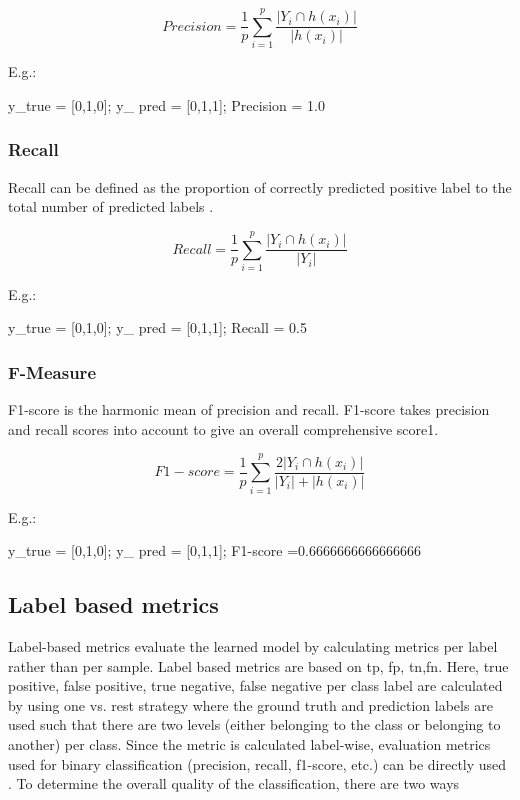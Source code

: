 $$Precision = \frac{1}{p}\sum_{i =1}^{p}\frac{|Y_i \cap h(x_i)|}{|h(x_i)|}$$ \cite{zhang2010multi}

E.g.: 

y\_true = [0,1,0]; 
y\_ pred = [0,1,1];  
Precision = 1.0

\subsubsection{Recall}

Recall can be defined as the proportion of correctly predicted positive label to the total number of predicted labels \cite{sorower2010literature}.

$$Recall = \frac{1}{p}\sum_{i =1}^{p}\frac{|Y_i \cap h(x_i)|}{|Y_i|}$$ \cite{zhang2010multi}

E.g.: 

y\_true = [0,1,0]; 
y\_ pred = [0,1,1];  
Recall = 0.5

\subsubsection{F-Measure}
F1-score is the harmonic mean of precision and recall. F1-score takes precision and recall scores into account to give an overall comprehensive score1\cite{sorower2010literature}.

$$F1-score = \frac{1}{p}\sum_{i =1}^{p}\frac{2|Y_i \cap h(x_i)|}{|Y_i| + |h(x_i)|}$$ \cite{zhang2010multi}

E.g.: 

y\_true = [0,1,0]; 
y\_ pred = [0,1,1]; 
F1-score =0.6666666666666666

\subsection{Label based metrics}
Label-based metrics evaluate the learned model by calculating metrics per label rather than per sample\cite{zhang2013review}. Label based metrics are based on \acrfull{tp}, \acrfull{fp}, \acrfull{tn},\acrfull{fn}. Here, true positive, false positive, true negative, false negative per class label are calculated by using one vs. rest strategy where the ground truth and prediction labels are used such that there are two levels (either belonging to the class or belonging to another) per class. Since the metric is calculated label-wise, evaluation metrics used for binary classification (precision, recall, f1-score, etc.)  can be directly used \cite{sorower2010literature}.  To determine the overall quality of the classification, there are two ways 
    
